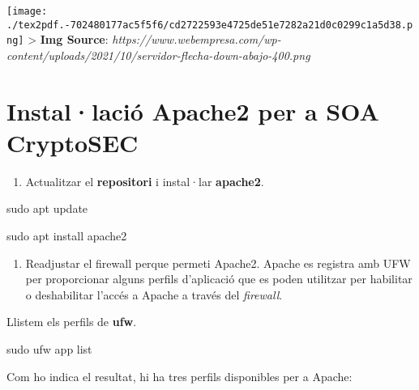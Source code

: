\documentclass[]{article}
\newenvironment{Shaded}{}{}
\newcommand{\FunctionTok}[1]{\textcolor[rgb]{0.02,0.16,0.49}{#1}}
\newcommand{\NormalTok}[1]{#1}
\providecommand{\tightlist}{%
  \setlength{\itemsep}{0pt}\setlength{\parskip}{0pt}}
\begin{document}
\texttt{[image: ./tex2pdf.-702480177ac5f5f6/cd2722593e4725de51e7282a21d0c0299c1a5d38.png]}
\textgreater{} \textbf{Img Source}:
\emph{https://www.webempresa.com/wp-content/uploads/2021/10/servidor-flecha-down-abajo-400.png}

\hypertarget{installaciuxf3-apache2-per-a-soa-cryptosec}{%
\section{\texorpdfstring{\textbf{Instal·lació Apache2 per a SOA
CryptoSEC}}{Instal·lació Apache2 per a SOA CryptoSEC}}\label{installaciuxf3-apache2-per-a-soa-cryptosec}}

\begin{enumerate}
\def\labelenumi{\arabic{enumi}.}
\tightlist
\item
  Actualitzar el \textbf{repositori} i instal·lar \textbf{apache2}.
\end{enumerate}

\begin{Shaded}
\begin{Highlighting}[]
\FunctionTok{sudo}\NormalTok{ apt update}
\end{Highlighting}
\end{Shaded}

\begin{Shaded}
\begin{Highlighting}[]
\FunctionTok{sudo}\NormalTok{ apt install apache2}
\end{Highlighting}
\end{Shaded}

\begin{enumerate}
\def\labelenumi{\arabic{enumi}.}
\setcounter{enumi}{1}
\tightlist
\item
  Readjustar el firewall perque permeti Apache2. Apache es registra amb
  UFW per proporcionar alguns perfils d'aplicació que es poden utilitzar
  per habilitar o deshabilitar l'accés a Apache a través del
  \emph{firewall}.
\end{enumerate}

Llistem els perfils de \textbf{ufw}.

\begin{Shaded}
\begin{Highlighting}[]
\FunctionTok{sudo}\NormalTok{ ufw app list}
\end{Highlighting}
\end{Shaded}

Com ho indica el resultat, hi ha tres perfils disponibles per a Apache:
\end{document}
